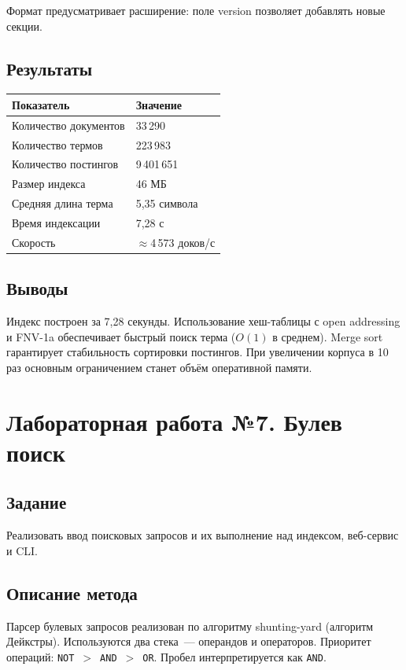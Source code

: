 \documentclass[12pt,a4paper]{article}
\begin{document}
Формат предусматривает расширение: поле version позволяет добавлять новые секции.

\subsection{Результаты}
\begin{table}[H]
\centering
\begin{tabular}{ll}
\toprule
\textbf{Показатель} & \textbf{Значение} \\
\midrule
Количество документов & 33\,290 \\
Количество термов & 223\,983 \\
Количество постингов & 9\,401\,651 \\
Размер индекса & 46 МБ \\
Средняя длина терма & 5{,}35 символа \\
Время индексации & 7{,}28 с \\
Скорость & $\approx$4\,573 доков/с \\
\bottomrule
\end{tabular}
\end{table}

\subsection{Выводы}
Индекс построен за 7{,}28 секунды. Использование хеш-таблицы с open addressing
и FNV-1a обеспечивает быстрый поиск терма ($O(1)$ в среднем). Merge sort
гарантирует стабильность сортировки постингов. При увеличении корпуса в 10 раз
основным ограничением станет объём оперативной памяти.

\section{Лабораторная работа №7. Булев поиск}

\subsection{Задание}
Реализовать ввод поисковых запросов и их выполнение над индексом, веб-сервис и CLI.

\subsection{Описание метода}
Парсер булевых запросов реализован по алгоритму shunting-yard (алгоритм Дейкстры).
Используются два стека~--- операндов и операторов. Приоритет операций:
\texttt{NOT}~$>$~\texttt{AND}~$>$~\texttt{OR}. Пробел интерпретируется как \texttt{AND}.
\end{document}
